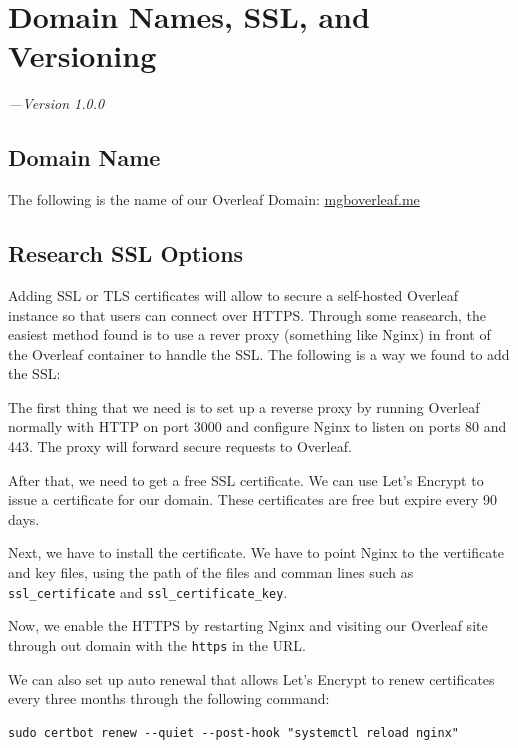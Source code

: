 \chapter{Domain Names, SSL, and Versioning}

{\large\textit{---Version 1.0.0}}


\section{Domain Name}
The following is the name of our Overleaf Domain:
\href{https://mgboverleaf.me}{mgboverleaf.me}

\section{Research SSL Options}
Adding SSL or TLS certificates will allow to secure a self-hosted Overleaf instance so that users can connect over HTTPS. Through some reasearch, the easiest method found is to use a rever proxy (something like Nginx) in front of the Overleaf container to handle the SSL. The following is a way we found to add the SSL:

The first thing that we need is to set up a reverse proxy by running Overleaf normally with HTTP on port 3000 and configure Nginx to listen on ports 80 and 443. The proxy will forward secure requests to Overleaf.

After that, we need to get a free SSL certificate. We can use Let's Encrypt to issue a certificate for our domain. These certificates are free but expire every 90 days.

Next, we have to install the certificate. We have to point Nginx to the vertificate and key files, using the path of the files and comman lines such as \texttt{ssl\_certificate} and \texttt{ssl\_certificate\_key}.

Now, we enable the HTTPS by restarting Nginx and visiting our Overleaf site through out domain with the \texttt{https} in the URL.

We can also set up auto renewal that allows Let's Encrypt to renew certificates every three months through the following command:

\begin{verbatim}
sudo certbot renew --quiet --post-hook "systemctl reload nginx"
\end{verbatim}

